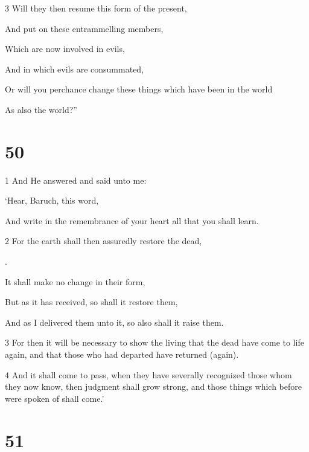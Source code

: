 \par 3 Will they then resume this form of the present,

\par And put on these entrammelling members,

\par Which are now involved in evils,

\par And in which evils are consummated,

\par Or will you perchance change these things which have been in the world

\par As also the world?”

\chapter{50}

\par 1 And He answered and said unto me:

\par ‘Hear, Baruch, this word,

\par And write in the remembrance of your heart all that you shall learn.

\par 2 For the earth shall then assuredly restore the dead,

\par [Which it now receives, in order to preserve them].

\par It shall make no change in their form,

\par But as it has received, so shall it restore them,

\par And as I delivered them unto it, so also shall it raise them.

\par 3 For then it will be necessary to show the living that the dead have come to life again, and that those who had departed have returned (again). 

\par 4 And it shall come to pass, when they have severally recognized those whom they now know, then judgment shall grow strong, and those things which before were spoken of shall come.’

\chapter{51}

